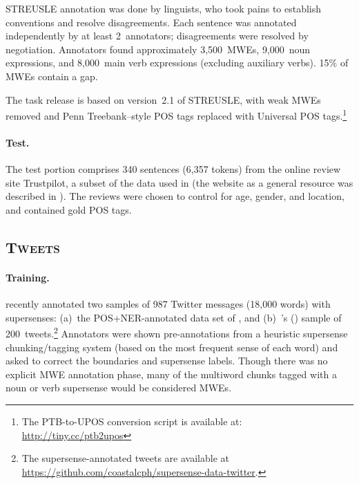 \documentclass[11pt,letterpaper]{article}
\newcommand{\citeposs}[1]{\citeauthor{#1}'s (\citeyear{#1})}
\newcommand{\ensuretext}[1]{#1}
\newcommand{\nssmarker}{\ensuretext{\textcolor{magenta}{\ensuremath{^{\textsc{NS}}_{\textsc{S}}}}}}
\newcommand{\arkcomment}[3]{\ensuretext{\textcolor{#3}{[#1 #2]}}}
\newcommand{\nss}[1]{\arkcomment{\nssmarker}{#1}{magenta}}
\newcommand{\dataset}[1]{\mbox{\textsc{#1}}}	%
\newcommand{\finalversion}[1]{}
\newcommand{\longversion}[1]{#1} %
\begin{document}
STREUSLE annotation was done by linguists, who took pains to establish conventions and resolve disagreements.
Each sentence was annotated independently by at least 2~annotators; disagreements were resolved by negotiation. 
Annotators found approximately 3,500~MWEs, 9,000~noun expressions, and 8,000~main verb expressions (excluding auxiliary verbs).\finalversion{\nss{
(\Cref{tbl:reviews} offers a more detailed breakdown.)}}
15\% of MWEs contain a gap.

The task release is based on version~2.1 of STREUSLE, with weak MWEs removed
and Penn Treebank--style POS tags replaced with Universal POS tags.\footnote{The PTB-to-UPOS conversion script is available at:
\mbox{\url{http://tiny.cc/ptb2upos}}} 


\paragraph{Test.}
The test portion comprises 340 sentences (6,357 tokens) from the online review site Trustpilot, a subset of the data used in \citet{hovy-2015age} 
(the website as a general resource was described in \citet{hovy-2015trustpilot}). 
The reviews were chosen to control for age, gender, and location, and contained gold POS tags. 
\finalversion{The data was further annotated for supersenses and MWE by \nss{?}.}

\subsection{\dataset{Tweets}} 
\paragraph{Training.}
\citet{johannsen-14} recently annotated two samples of 987 Twitter messages (18,000 words) 
with supersenses\longversion{: 
(a)~the POS+NER-annotated data set of \citet{ritter-11}, 
and 
(b)~\citeposs{plank-14} sample of 200~tweets}.\footnote{The supersense-annotated tweets 
are available at \url{https://github.com/coastalcph/supersense-data-twitter}.}
Annotators were shown pre-annotations from a heuristic supersense chunking\slash tagging system%
\longversion{ (based on the most frequent sense of each word)}
and asked to correct the boundaries and supersense labels. 
Though there was no explicit MWE annotation phase, 
many of the multiword chunks tagged with a \longversion{noun or verb }supersense would be considered MWEs.\finalversion{\nss{POS?}}
\end{document}
